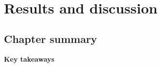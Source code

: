 \chapter{Results and discussion}

\blindtext[1]

\section{Chapter summary}
    \begin{mdframed}[style=plainSty,innertopmargin=8pt] %
        {\center \textbf{\sffamily Key takeaways} \par}
        \noindent 
        \blindtext[1]
    \end{mdframed}
